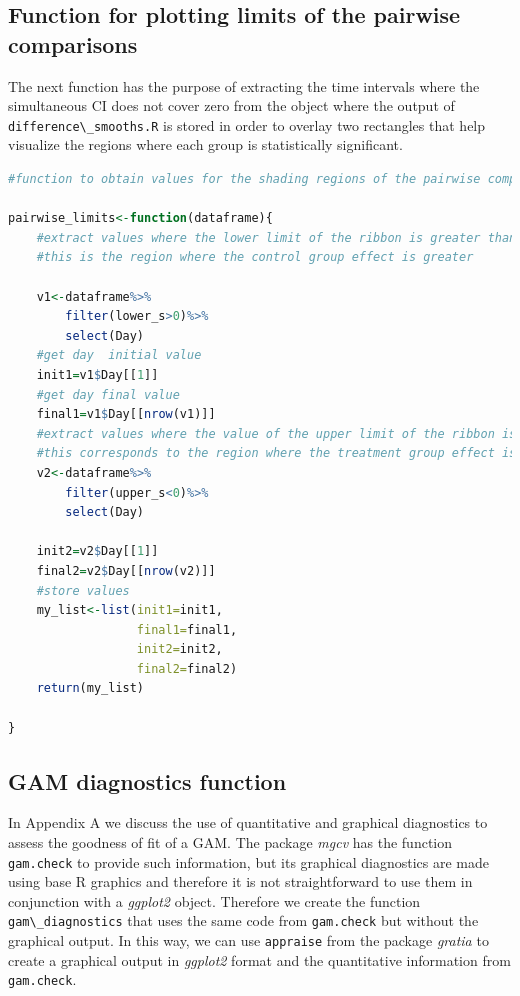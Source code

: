 \documentclass[
]{article}
\newcommand{\passthrough}[1]{#1}
\begin{document}
\hypertarget{function-for-plotting-limits-of-the-pairwise-comparisons}{%
\subsection{Function for plotting limits of the pairwise comparisons}\label{function-for-plotting-limits-of-the-pairwise-comparisons}}

The next function has the purpose of extracting the time intervals where the simultaneous CI does not cover zero from the object where the output of \passthrough{\lstinline!difference\_smooths.R!} is stored in order to overlay two rectangles that help visualize the regions where each group is statistically significant.

\begin{lstlisting}[language=R]
#function to obtain values for the shading regions of the pairwise comparison between the smooths

pairwise_limits<-function(dataframe){
    #extract values where the lower limit of the ribbon is greater than zero
    #this is the region where the control group effect is greater

    v1<-dataframe%>%
        filter(lower_s>0)%>%
        select(Day)
    #get day  initial value
    init1=v1$Day[[1]]
    #get day final value
    final1=v1$Day[[nrow(v1)]]
    #extract values where the value of the upper limit of the ribbon is lower than zero
    #this corresponds to the region where the treatment group effect is greater
    v2<-dataframe%>%
        filter(upper_s<0)%>%
        select(Day)

    init2=v2$Day[[1]]
    final2=v2$Day[[nrow(v2)]]
    #store values
    my_list<-list(init1=init1,
                  final1=final1,
                  init2=init2,
                  final2=final2)
    return(my_list)

}
\end{lstlisting}

\hypertarget{gam-diagnostics-function}{%
\subsection{GAM diagnostics function}\label{gam-diagnostics-function}}

In Appendix A we discuss the use of quantitative and graphical diagnostics to assess the goodness of fit of a GAM. The package \emph{mgcv} has the function \passthrough{\lstinline!gam.check!} to provide such information, but its graphical diagnostics are made using base R graphics and therefore it is not straightforward to use them in conjunction with a \emph{ggplot2} object. Therefore we create the function \passthrough{\lstinline!gam\_diagnostics!} that uses the same code from \passthrough{\lstinline!gam.check!} but without the graphical output. In this way, we can use \passthrough{\lstinline!appraise!} from the package \emph{gratia} to create a graphical output in \emph{ggplot2} format and the quantitative information from \passthrough{\lstinline!gam.check!}.
\end{document}
